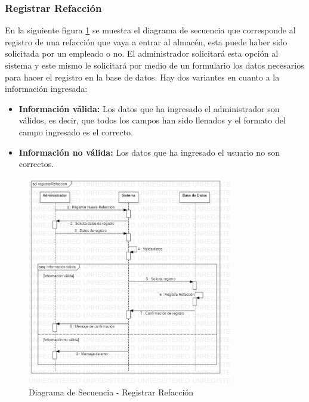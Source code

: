 \subsubsection{Registrar Refacción}
En la siguiente figura \ref{fig:Diagrama de Secuencia - Registrar Refaccion} se muestra el diagrama de secuencia que corresponde al registro de una refacción que vaya a entrar al almacén, esta puede haber sido solicitada por un empleado o no. El administrador solicitará esta opción al sistema y este mismo le solicitará por medio de un formulario los datos necesarios para hacer el registro en la base de datos. Hay dos variantes en cuanto a la información ingresada: 
\begin{itemize}
	\item \textbf{Información válida:} Los datos que ha ingresado el administrador son válidos, es decir, que todos los campos han sido llenados y el formato del campo ingresado es el correcto. 
	\item \textbf{Información no válida:} Los datos que ha ingresado el usuario no son correctos. 
\end{itemize}
\begin{figure}[!h]
	\centering
	\includegraphics[width=0.8\textwidth]{./diseno/vprocesos/imagenes/registrarRefaccion}
	\caption{Diagrama de Secuencia - Registrar Refacción}
	\label{fig:Diagrama de Secuencia - Registrar Refaccion}
\end{figure}